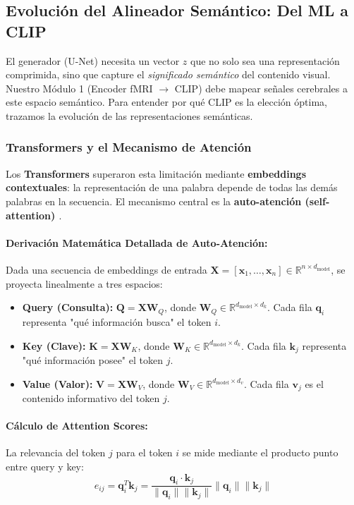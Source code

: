 \documentclass{article}
\begin{document}
\subsection{Evolución del Alineador Semántico: Del ML a CLIP}

El generador (U-Net) necesita un vector $z$ que no solo sea una representación comprimida, sino que capture el \textit{significado semántico} del contenido visual. Nuestro Módulo 1 (Encoder fMRI $\rightarrow$ CLIP) debe mapear señales cerebrales a este espacio semántico. Para entender por qué CLIP es la elección óptima, trazamos la evolución de las representaciones semánticas.
\subsubsection{Transformers y el Mecanismo de Atención}

Los \textbf{Transformers} superaron esta limitación mediante \textbf{embeddings contextuales}: la representación de una palabra depende de todas las demás palabras en la secuencia. El mecanismo central es la \textbf{auto-atención (self-attention) \cite{15}}.
\paragraph{Derivación Matemática Detallada de Auto-Atención:}
Dada una secuencia de embeddings de entrada $\mathbf{X} = [\mathbf{x}_1, \ldots, \mathbf{x}_n] \in \mathbb{R}^{n \times d_{\text{model}}}$, se proyecta linealmente a tres espacios:

\begin{itemize}
    \item \textbf{Query (Consulta):} $\mathbf{Q} = \mathbf{X} \mathbf{W}_Q$, donde $\mathbf{W}_Q \in \mathbb{R}^{d_{\text{model}} \times d_k}$. Cada fila $\mathbf{q}_i$ representa "qué información busca" el token $i$.
    \item \textbf{Key (Clave):} $\mathbf{K} = \mathbf{X} \mathbf{W}_K$, donde $\mathbf{W}_K \in \mathbb{R}^{d_{\text{model}} \times d_k}$. Cada fila $\mathbf{k}_j$ representa "qué información posee" el token $j$.
    \item \textbf{Value (Valor):} $\mathbf{V} = \mathbf{X} \mathbf{W}_V$, donde $\mathbf{W}_V \in \mathbb{R}^{d_{\text{model}} \times d_v}$. Cada fila $\mathbf{v}_j$ es el contenido informativo del token $j$.
\end{itemize}

\paragraph{Cálculo de Attention Scores:}
La relevancia del token $j$ para el token $i$ se mide mediante el producto punto entre query y key:
\begin{equation}
e_{ij} = \mathbf{q}_i^T \mathbf{k}_j = \frac{\mathbf{q}_i \cdot \mathbf{k}_j}{\|\mathbf{q}_i\| \|\mathbf{k}_j\|} \|\mathbf{q}_i\| \|\mathbf{k}_j\|
\end{equation}
\end{document}
